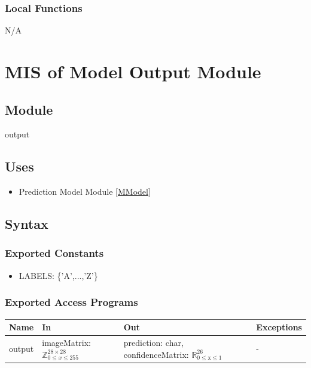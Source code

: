 \documentclass[12pt, titlepage]{article}
\begin{document}
\subsubsection{Local Functions}

N/A

\newpage
\section{MIS of Model Output Module} \label{MOutput}

\subsection{Module}

output
\subsection{Uses}

\begin{itemize}
  \item Prediction Model Module \ref{MModel}
\end{itemize}


\subsection{Syntax}

\subsubsection{Exported Constants}

\begin{itemize}
  \item LABELS: \{'A',...,'Z'\}
\end{itemize}

\subsubsection{Exported Access Programs}

\begin{center}
\begin{tabular}{p{2cm} p{4cm} p{4cm} p{2cm}}
\hline
\textbf{Name} & \textbf{In} & \textbf{Out} & \textbf{Exceptions} \\
\hline
output & imageMatrix: $\mathbb{Z}^{28 \times 28}_{0 \le x \le 255}$ & prediction: char, confidenceMatrix: $\mathbb{R}_{\text{0} \leq \text{x} \leq \text{1}}^{26}$ & - \\
\hline
\end{tabular}
\end{center}
\end{document}
